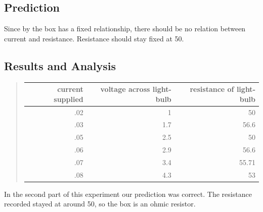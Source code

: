 \documentclass[12pt]{article}
\begin{document}
\subsection*{Prediction}
Since by the box has a fixed relationship, there should be no relation between current and resistance. Resistance should stay fixed at 50.
\subsection*{Results and Analysis}
\begin{quote}
	\begin{tabular}{|r|r|r|}
	\hline 
	current supplied & voltage across light-bulb & resistance of light-bulb \\
	\hline 
	.02 & 1 & 50 \\
	.03 & 1.7 & 56.6 \\
	.05 & 2.5 & 50 \\
	.06 & 2.9 & 56.6 \\
	.07 & 3.4 & 55.71 \\
	.08 & 4.3 & 53 \\
	\hline 
	\end{tabular}
\end{quote}
In the second part of this experiment our prediction was correct.  The resistance recorded stayed at around 50, so the box is an ohmic resistor. 
\end{document}
